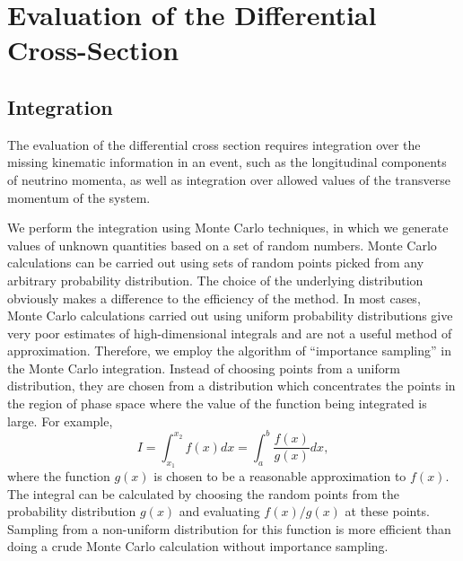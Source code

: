 \documentclass{cmspaper}
\begin{document}
\section{Evaluation of the Differential Cross-Section}

\subsection{Integration}
The evaluation of the differential cross section requires integration over the missing kinematic information in an event, such 
as the longitudinal components of neutrino momenta, as well as integration over allowed values of the transverse momentum
of the system.

We perform the integration using Monte Carlo techniques, in which we generate values of unknown quantities based on a set of
random numbers.  Monte Carlo calculations can be carried out using sets of random points picked from any arbitrary probability 
distribution. The choice of the underlying distribution obviously makes a difference to the efficiency of the method. In most cases,
Monte Carlo calculations carried out using uniform probability distributions give very poor estimates of high-dimensional integrals
and are not a useful method of approximation. 
Therefore, we employ the algorithm of ``importance sampling'' in the Monte Carlo integration. Instead of choosing points from a 
uniform distribution, they are chosen from a distribution which concentrates the points in the region of phase space where the 
value of the function being integrated is large.  For example,
\begin{equation}
\label{eqn:ImpSampling}
I=\int_{x_{1}}^{x_{2}} f(x)dx = \int_{a}^{b} \frac{f(x)}{g(x)}dx,
\end{equation}
where the function $g(x)$ is chosen to be a reasonable approximation to $f(x)$. The integral can be calculated by choosing the random points 
from the probability distribution $g(x)$ and evaluating $f(x)/g(x)$ at these points.  Sampling from a non-uniform distribution for this function 
is more efficient than doing a crude Monte Carlo calculation without importance sampling.
\end{document}
